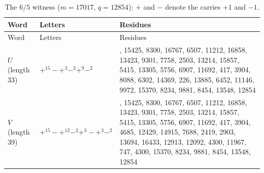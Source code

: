 \documentclass[11pt,reqno]{amsart}
\theoremstyle{definition}
\theoremstyle{remark}
\begin{document}

\begingroup
\small
\setlength{\tabcolsep}{4pt}
\renewcommand{\arraystretch}{1.15}
\setlength{\LTcapwidth}{\textwidth}
\begin{longtable}{@{}>{\raggedright\arraybackslash}p{} >{\raggedright\arraybackslash}p{} >{\raggedright\arraybackslash}p{}@{}}
\caption{The \(6/5\) witness (\(m=17017\), \(q=12854\)); \(+\)
and \(-\) denote the carries \(+1\) and \(-1\).}\label{tab:15}\\
\toprule
Word & Letters & Residues \\
\midrule
\endfirsthead
\toprule
Word & Letters & Residues \\
\midrule
\endhead
\bottomrule
\endlastfoot
\(U\) (length 33) & \(+^{15}-+^{3}-^{3}+^{9}-^{2}\) & 12854,\allowbreak{} 15425,\allowbreak{} 8300,\allowbreak{} 16767,\allowbreak{} 6507,\allowbreak{} 11212,\allowbreak{} 16858,\allowbreak{} 13423,\allowbreak{} 9301,\allowbreak{} 7758,\allowbreak{} 2503,\allowbreak{} 13214,\allowbreak{} 15857,\allowbreak{} 5415,\allowbreak{} 13305,\allowbreak{} 5756,\allowbreak{} 6907,\allowbreak{} 11692,\allowbreak{} 417,\allowbreak{} 3904,\allowbreak{} 8088,\allowbreak{} 6302,\allowbreak{} 14369,\allowbreak{} 226,\allowbreak{} 13885,\allowbreak{} 6452,\allowbreak{} 11146,\allowbreak{} 9972,\allowbreak{} 15370,\allowbreak{} 8234,\allowbreak{} 9881,\allowbreak{} 8454,\allowbreak{} 13548,\allowbreak{} 12854 \\*
\(V\) (length 39) & \(+^{15}-+^{12}-^{2}+^{3}-+^{3}-^{2}\) & 12854,\allowbreak{} 15425,\allowbreak{} 8300,\allowbreak{} 16767,\allowbreak{} 6507,\allowbreak{} 11212,\allowbreak{} 16858,\allowbreak{} 13423,\allowbreak{} 9301,\allowbreak{} 7758,\allowbreak{} 2503,\allowbreak{} 13214,\allowbreak{} 15857,\allowbreak{} 5415,\allowbreak{} 13305,\allowbreak{} 5756,\allowbreak{} 6907,\allowbreak{} 11692,\allowbreak{} 417,\allowbreak{} 3904,\allowbreak{} 4685,\allowbreak{} 12429,\allowbreak{} 14915,\allowbreak{} 7688,\allowbreak{} 2419,\allowbreak{} 2903,\allowbreak{} 13694,\allowbreak{} 16433,\allowbreak{} 12913,\allowbreak{} 12092,\allowbreak{} 4300,\allowbreak{} 11967,\allowbreak{} 747,\allowbreak{} 4300,\allowbreak{} 15370,\allowbreak{} 8234,\allowbreak{} 9881,\allowbreak{} 8454,\allowbreak{} 13548,\allowbreak{} 12854 \\
\end{longtable}
\endgroup
\end{document}
